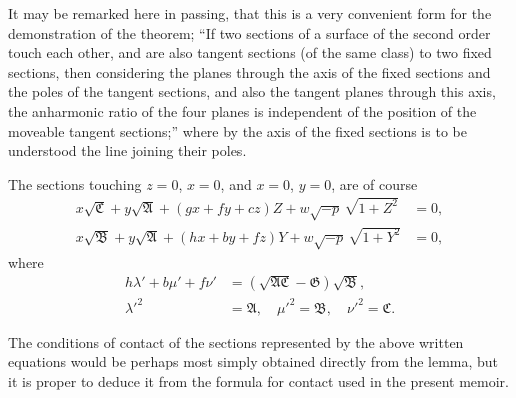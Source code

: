 \documentclass[11pt]{article}
\begin{document}
It may be remarked here in passing, that this is a very convenient form for the demonstration of the theorem; ``If two sections of a surface of the second order touch each other, and are also tangent sections (of the same class) to two fixed sections, then considering the planes through the axis of the fixed sections and the poles of the tangent sections, and also the tangent planes through this axis, the anharmonic ratio of the four planes is independent of the position of the moveable tangent sections;'' where by the axis of the fixed sections is to be understood the line joining their poles.

The sections touching $z=0$, $x=0$, and $x=0$, $y=0$, are of course
\begin{align*}
x\sqrt{\mathfrak{C}} + y\sqrt{\mathfrak{A}} + (gx+fy+cz)Z + w\sqrt{-p}\,\sqrt{1+Z^2} &= 0,\\
x\sqrt{\mathfrak{B}} + y\sqrt{\mathfrak{A}} + (hx+by+fz)Y + w\sqrt{-p}\,\sqrt{1+Y^2} &= 0,
\end{align*}
where
\begin{align*}
h\lambda'+b\mu'+f\nu' &= (\sqrt{\mathfrak{A}\mathfrak{C}}-\mathfrak{G})\sqrt{\mathfrak{B}},\\
\lambda'^2 &= \mathfrak{A}, \quad \mu'^2 = \mathfrak{B}, \quad \nu'^2 = \mathfrak{C}.
\end{align*}

\newpage
\setcounter{page}{66}

The conditions of contact of the sections represented by the above written equations would be perhaps most simply obtained directly from the lemma, but it is proper to deduce it from the formula for contact used in the present memoir.
\end{document}
